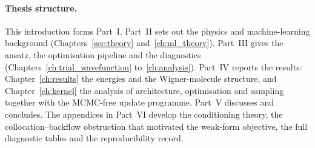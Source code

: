 \paragraph{Thesis structure.}
This introduction forms Part~I. Part~II sets out the physics and machine-learning background
(Chapters~\ref{sec:theory} and~\ref{ch:ml_theory}). Part~III gives the ansatz, the
optimisation pipeline and the diagnostics (Chapters~\ref{ch:trial_wavefunction}
to~\ref{ch:analysis}). Part~IV reports the results: Chapter~\ref{ch:results} the energies
and the Wigner-molecule structure, and Chapter~\ref{ch:kernel} the analysis of
architecture, optimisation and sampling together with the MCMC-free update
programme. Part~V discusses and concludes. The appendices in Part~VI develop the
conditioning theory, the collocation--backflow obstruction that motivated the weak-form
objective, the full diagnostic tables and the reproducibility record.
